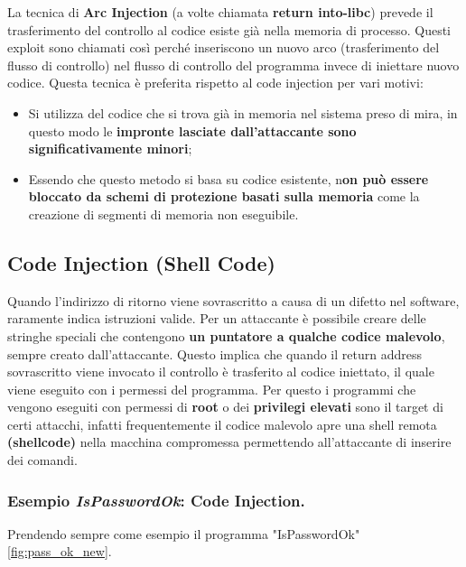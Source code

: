 La tecnica di \textbf{Arc Injection} (a volte chiamata \textbf{return into-libc}) prevede
il trasferimento del controllo al codice esiste già nella memoria di processo.
Questi exploit sono chiamati così perché inseriscono un nuovo arco
(trasferimento del flusso di controllo) nel flusso di controllo del programma invece
di iniettare nuovo codice. Questa tecnica è preferita rispetto al code injection
per vari motivi:

\begin{itemize}
    \item Si utilizza del codice che si trova già in memoria nel sistema preso di mira,
          in questo modo le \textbf{impronte lasciate dall'attaccante sono significativamente minori};
    \item Essendo che questo metodo si basa su codice
          esistente, n\textbf{on può essere bloccato da schemi di protezione basati sulla memoria}
          come la creazione di segmenti di memoria non eseguibile.
\end{itemize}

\subsection{Code Injection (Shell Code)}

Quando l'indirizzo di ritorno viene sovrascritto a causa di un difetto nel software,
raramente indica istruzioni valide. Per un attaccante è possibile creare delle
stringhe speciali che contengono \textbf{un puntatore a qualche codice malevolo},
sempre creato dall'attaccante. Questo implica che quando il return address sovrascritto
viene invocato il controllo è trasferito al codice iniettato, il quale viene
eseguito con i permessi del programma. Per questo i programmi che vengono eseguiti
con permessi di \textbf{root} o dei \textbf{privilegi elevati} sono il target di
certi attacchi, infatti frequentemente il codice malevolo apre una shell remota
\textbf{(shellcode)} nella macchina compromessa permettendo all'attaccante di inserire
dei comandi.

\subsubsection{Esempio \textit{IsPasswordOk}: Code Injection.}

Prendendo sempre come esempio il programma "IsPasswordOk" \ref{fig:pass_ok_new}.


